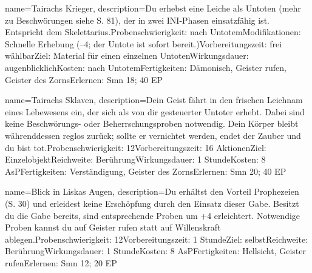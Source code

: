 {
    name={Tairachs Krieger},
    description={Du erhebst eine Leiche als Untoten (mehr zu Beschwörungen siehe S. 81), der in zwei INI-Phasen einsatzfähig ist. Entspricht dem Skelettarius.\newline Probenschwierigkeit: nach Untotem\newline Modifikationen: Schnelle Erhebung (–4; der Untote ist sofort bereit.)\newline Vorbereitungszeit: frei wählbar\newline Ziel: Material für einen einzelnen Untoten\newline Wirkungsdauer: augenblicklich\newline Kosten: nach Untotem\newline Fertigkeiten: Dämonisch, Geister rufen, Geister des Zorns\newline Erlernen: Smn 18; 40 EP}
}


{
    name={Tairachs Sklaven},
    description={Dein Geist fährt in den frischen Leichnam eines Lebewesens ein, der sich als von dir gesteuerter Untoter erhebt. Dabei sind keine Beschwörungs- oder Beherrschungsproben notwendig. Dein Körper bleibt währenddessen reglos zurück; sollte er vernichtet werden, endet der Zauber und du bist tot.\newline Probenschwierigkeit: 12\newline Vorbereitungszeit: 16 Aktionen\newline Ziel: Einzelobjekt\newline Reichweite: Berührung\newline Wirkungsdauer: 1 Stunde\newline Kosten: 8 AsP\newline Fertigkeiten: Verständigung, Geister des Zorns\newline Erlernen: Smn 20; 40 EP}
}


{
    name={Blick in Liskas Augen},
    description={Du erhältst den Vorteil Prophezeien (S. 30) und erleidest keine Erschöpfung durch den Einsatz dieser Gabe. Besitzt du die Gabe bereits, sind entsprechende Proben um +4 erleichtert. Notwendige Proben kannst du auf Geister rufen statt auf Willenskraft ablegen.\newline Probenschwierigkeit: 12\newline Vorbereitungszeit: 1 Stunde\newline Ziel: selbst\newline Reichweite: Berührung\newline Wirkungsdauer: 1 Stunde\newline Kosten: 8 AsP\newline Fertigkeiten: Hellsicht, Geister rufen\newline Erlernen: Smn 12; 20 EP}
}


